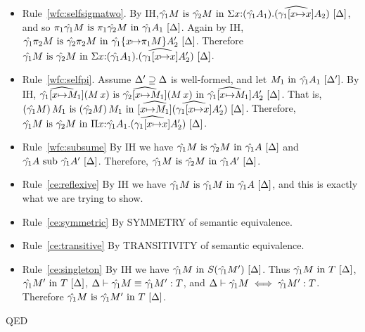 \documentclass{article}
\theoremstyle{break}
\newcommand{\qed}{\mbox{QED}}
\newenvironment{proof}{\noindent{\bf Proof:}\hspace*{0.5em}}{\hspace*{\fill}\qed}
\begin{document}
\begin{proof}
\begin{itemize}
\item Rule~\ref{wfc:selfsigmatwo}.
By IH,$\semanticequivterm{\world}{\envone\constructor}{\envtwo\constructor}
   {\ksigma{\cvar}{(\envone\kind_1)}{(\envonex{\kind_2})}}$, and so
$\semanticequivterm{\world}{\cpi{1}{\envone\constructor}}{\cpi{1}{\envtwo\constructor}}
   {\envone\kind_1}$.
Again by IH, 
$\semanticequivterm{\world}{\envone{\cpi{2}{\constructor}}}{\envtwo{\cpi{2}{\constructor}}}
   {\envone{\substitute{\cvar}{\cpi{1}{\constructor}}{\kind'_2}}}$.
Therefore
$\semanticequivterm{\world}{\envone\constructor}{\envtwo\constructor}
   {\ksigma{\cvar}{(\envone\kind_1)}{(\envonex{\kind'_2})}}$.

\item Rule~\ref{wfc:selfpi}.
Assume $\world'\supseteq\world$ is well-formed, and let
$\semanticvalidterm{\world'}{\constructor_1}{\envone\kind_1}$.
By IH,
$\semanticequivterm{\world}{\widehat{\envone[\cvar{\mapsto}\constructor_1]}(\capply{\constructor}{\cvar})}
   {\widehat{\envtwo[\cvar{\mapsto}\constructor_1]}(\capply{\constructor}{\cvar})}
   {\widehat{\envone[\cvar{\mapsto}\constructor_1]}\kind'_2}$.
That is,
$\semanticequivterm{\world}{\capply{(\envone\constructor)}\constructor_1}
   {\capply{(\envtwo\constructor)}\constructor_1}
   {\widehat{[\cvar{\mapsto}\constructor_1]}(\envonex\kind'_2)}$.
Therefore,
$\semanticequivterm{\world}{\envone\constructor}{\envtwo\constructor}
   {\kpi{\cvar}{\envone\kind_1}{(\envonex\kind'_2)}}$.

\item Rule~\ref{wfc:subsume}
By IH we have
$\semanticequivterm{\world}{\envone\constructor}{\envtwo\constructor}{\envone\kind}$
and
$\semanticsubtype{\world}{\envone\kind}{\envone\kind'}$.
Therefore,
$\semanticequivterm{\world}{\envone\constructor}{\envtwo\constructor}{\envone\kind'}$.

\item Rule~\ref{ce:reflexive}
By IH we have
$\semanticequivterm{\world}{\envone\constructor}{\envone\constructor}{\envone{\kind}}$,
and this is exactly what we are trying to show.

\item Rule~\ref{ce:symmetric}
By SYMMETRY of semantic equivalence.

\item Rule~\ref{ce:transitive}
By TRANSITIVITY of semantic equivalence.

\item Rule~\ref{ce:singleton}
By IH we have
$\semanticvalidterm{\world}{\envone\constructor}{\ksingleton{\envone\constructor'}}$.
Thus
$\semanticvalidterm{\world}{\envone\constructor}{\ktype}$,
$\semanticvalidterm{\world}{\envone\constructor'}{\ktype}$,
$\equivconstructor{\world}{\envone\constructor}{\envone\constructor'}{\ktype}$, and
$\aconequiv{\world}{\envone\constructor}{\envone\constructor'}{\ktype}$.
Therefore
$\semanticequivterm{\world}{\envone\constructor}{\envone\constructor'}{\ktype}$.


\end{itemize}
\end{proof}
\end{document}
